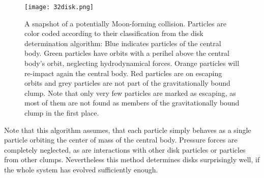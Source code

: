 \begin{figure}[htbp]
\begin{center}
\texttt{[image: 32disk.png]}
\caption{A snapshot of a potentially Moon-forming collision. Particles are color coded according to their classification from the disk determination algorithm: Blue indicates particles of the central body. Green particles have orbits with a perihel above the central body's orbit, neglecting hydrodynamical forces. Orange particles will re-impact again the central body. Red particles are on escaping orbits and grey particles are not part of the gravitationally bound clump. Note that only very few particles are marked as escaping, as most of them are not found as members of the gravitationally bound clump in the first place.}
\label{ch02_fig32}
\end{center}
\end{figure}

Note that this algorithm assumes, that each particle simply behaves as a single particle orbiting the center of mass of the central body. Pressure forces are completely neglected, as are interactions with other disk particles or particles from other clumps. Nevertheless this method determines disks surprisingly well, if the whole system has evolved sufficiently enough. 





